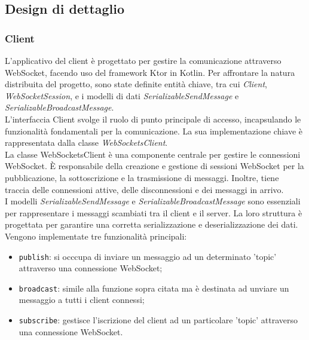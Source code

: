 \subsection{Design di dettaglio}

\subsubsection{Client}

L'applicativo del client è progettato per gestire la comunicazione attraverso WebSocket,
facendo uso del framework Ktor in Kotlin. Per affrontare la natura distribuita del progetto,
sono state definite entità chiave, tra cui \textit{Client}, \textit{WebSocketSession}, e i modelli di dati
\textit{SerializableSendMessage} e \textit{SerializableBroadcastMessage}. \\

L'interfaccia Client svolge il ruolo di punto principale di accesso, incapsulando le funzionalità fondamentali per la
comunicazione. La sua implementazione chiave è rappresentata dalla classe \textit{WebSocketsClient}.\\

La classe WebSocketsClient è una componente centrale per gestire le connessioni WebSocket.
È responsabile della creazione e gestione di sessioni WebSocket per la pubblicazione,
la sottoscrizione e la trasmissione di messaggi. Inoltre, tiene traccia delle connessioni attive, delle disconnessioni e dei messaggi in arrivo.\\

I modelli \textit{SerializableSendMessage} e \textit{SerializableBroadcastMessage} sono essenziali per rappresentare i messaggi scambiati tra il client e
il server. La loro struttura è progettata per garantire una corretta serializzazione e deserializzazione dei dati. \\

Vengono implementate tre funzionalità principali:
\begin{itemize}
    \item \texttt{publish}: si occcupa di inviare un messaggio ad un determinato 'topic' attraverso una connessione WebSocket;
    \item \texttt{broadcast}: simile alla funzione sopra citata ma è destinata ad unviare un messaggio a tutti i client connessi;
    \item \texttt{subscribe}: gestisce l'iscrizione del client ad un particolare 'topic' attraverso una connessione WebSocket.
\end{itemize}

